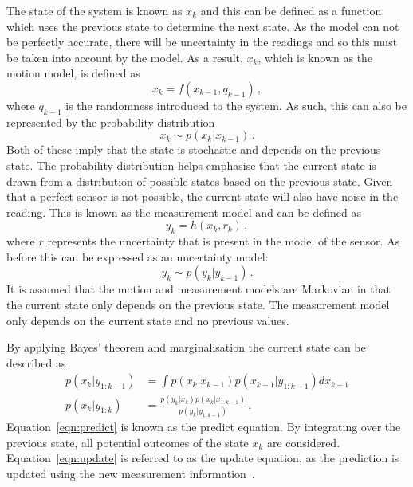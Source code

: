 The state of the system is known as $x_k$ and
this can be defined as a function which uses the previous state to determine the next
state. As the model can not be perfectly accurate, there will be uncertainty in the
readings and so this must be taken into account by the model. As a result, $x_k$,
which is known as the motion model, is defined as
\begin{equation}
x_{k} = f(x_{k-1}, q_{k-1})\,,
\end{equation}
where $q_{k-1}$ is the randomness introduced to the system. As such, this can
also be represented by the probability distribution
\begin{equation}
x_{k} \sim p(x_{k} | x_{k-1})\,.
\end{equation}
Both of these imply that the state is stochastic and depends on the previous
state. The probability distribution helps emphasise that the current state is
drawn from a distribution of possible states based on the previous state. Given that a perfect sensor is not possible, the current state will also have noise
in the reading. This is known as the measurement model and can be defined as
\begin{equation}
y_{k} = h(x_{k}, r_{k})\,,
\end{equation}
where $r$ represents the uncertainty that is present in the model of the sensor. As
before this can be expressed as an uncertainty model:
\begin{equation}
y_{k} \sim p(y_{k} | y_{k-1})\,.
\end{equation}
It is assumed that the motion and measurement models are Markovian in that
the current state only depends on the previous state. The measurement model only
depends on the current state and no previous values.

By applying Bayes' theorem and marginalisation the current state can be described as
\begin{align}
\label{eqn:predict}
p(x_{k} | y_{1:k-1}) & = \int p(x_{k}|x_{k-1}) p(x_{k-1} | y_{1:k-1}) dx_{k-1} \\
\label{eqn:update}
p(x_{k} | y_{1:k}) &= \frac{ p(y_{k}|x_{k})p(x_{k}|x_{1:k-1})}{ p(y_{k}|y_{1:k-1})}\,.
\end{align}
Equation~\ref{eqn:predict} is known as the predict equation. By integrating over
the previous state, all potential outcomes of the state $x_k$ are
considered. Equation~\ref{eqn:update} is referred to as the update equation,
as the prediction is updated using the new measurement information~\cite{kam1997sensorfusion}.


